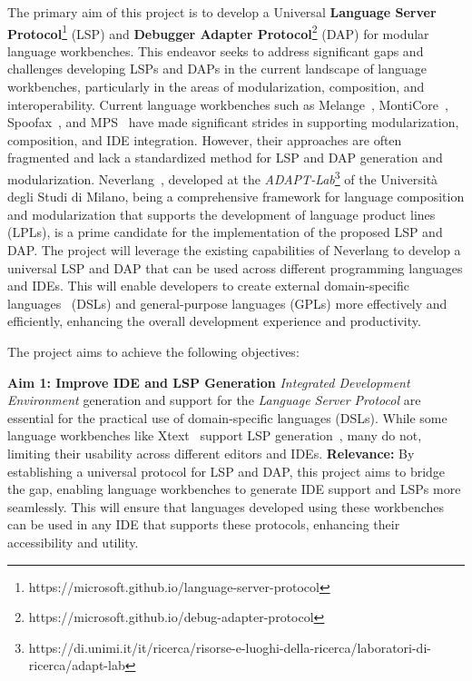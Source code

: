 The primary aim of this project is to develop a Universal \textbf{Language Server Protocol}\footnote{https://microsoft.github.io/language-server-protocol} (LSP) and \textbf{Debugger Adapter Protocol}\footnote{https://microsoft.github.io/debug-adapter-protocol} (DAP) for modular language workbenches. This endeavor seeks to address significant gaps and challenges developing LSPs and DAPs in the current landscape of language workbenches, particularly in the areas of modularization, composition, and interoperability. Current language workbenches such as Melange~\cite{Degueule15}, MontiCore~\cite{Krahn10}, Spoofax~\cite{Visser10}, and MPS~\cite{Volter11, Voelter12} have made significant strides in supporting modularization, composition, and IDE integration. However, their approaches are often fragmented and lack a standardized method for LSP and DAP generation and modularization.
Neverlang~\cite{Cazzola15c, Cazzola14c}, developed at the \textit{ADAPT-Lab}\footnote{https://di.unimi.it/it/ricerca/risorse-e-luoghi-della-ricerca/laboratori-di-ricerca/adapt-lab} of the Università degli Studi di Milano, being a comprehensive framework for language composition and modularization that supports the development of language product lines~\cite{Cazzola15f, Cazzola21b} (LPLs), is a prime candidate for the implementation of the proposed LSP and DAP. The project will leverage the existing capabilities of Neverlang to develop a universal LSP and DAP that can be used across different programming languages and IDEs. This will enable developers to create external domain-specific languages~\cite{Fowler10} (DSLs) and general-purpose languages (GPLs) more effectively and efficiently, enhancing the overall development experience and productivity.

\hfill \break
The project aims to achieve the following objectives:

\hfill \break
\noindent
\textbf{Aim 1: Improve IDE and LSP Generation}
\hfill \break
\textit{Integrated Development Environment} generation and support for the \textit{Language Server Protocol} are essential for the practical use of domain-specific languages (DSLs). While some language workbenches like Xtext~\cite{Bettini13b} support LSP generation~\cite{Barros22}, many do not, limiting their usability across different editors and IDEs.
\hfill \break
\textbf{Relevance:} By establishing a universal protocol for LSP and DAP, this project aims to bridge the gap, enabling language workbenches to generate IDE support and LSPs more seamlessly. This will ensure that languages developed using these workbenches can be used in any IDE that supports these protocols, enhancing their accessibility and utility.

